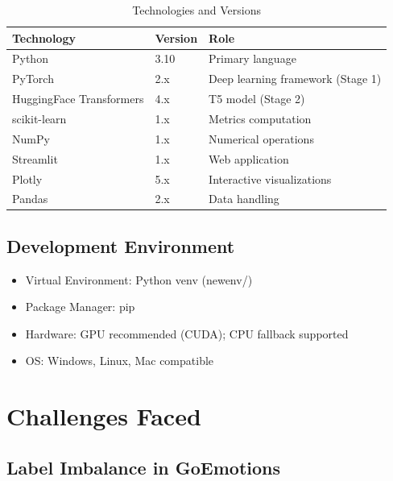 \documentclass[12pt, a4paper]{report}
\begin{document}
\begin{table}[H]
    \centering
    \caption{Technologies and Versions}
    \label{tab:tech_stack}
    \begin{tabular}{@{}lll@{}}
        \toprule
        \textbf{Technology} & \textbf{Version} & \textbf{Role} \\
        \midrule
        Python & 3.10 & Primary language \\
        PyTorch & 2.x & Deep learning framework (Stage 1) \\
        HuggingFace Transformers & 4.x & T5 model (Stage 2) \\
        scikit-learn & 1.x & Metrics computation \\
        NumPy & 1.x & Numerical operations \\
        Streamlit & 1.x & Web application \\
        Plotly & 5.x & Interactive visualizations \\
        Pandas & 2.x & Data handling \\
        \bottomrule
    \end{tabular}
\end{table}

\section{Development Environment}

\begin{itemize}
    \item Virtual Environment: Python venv (newenv/)
    \item Package Manager: pip
    \item Hardware: GPU recommended (CUDA); CPU fallback supported
    \item OS: Windows, Linux, Mac compatible
\end{itemize}

\chapter{Challenges Faced}

\section{Label Imbalance in GoEmotions}
\end{document}
